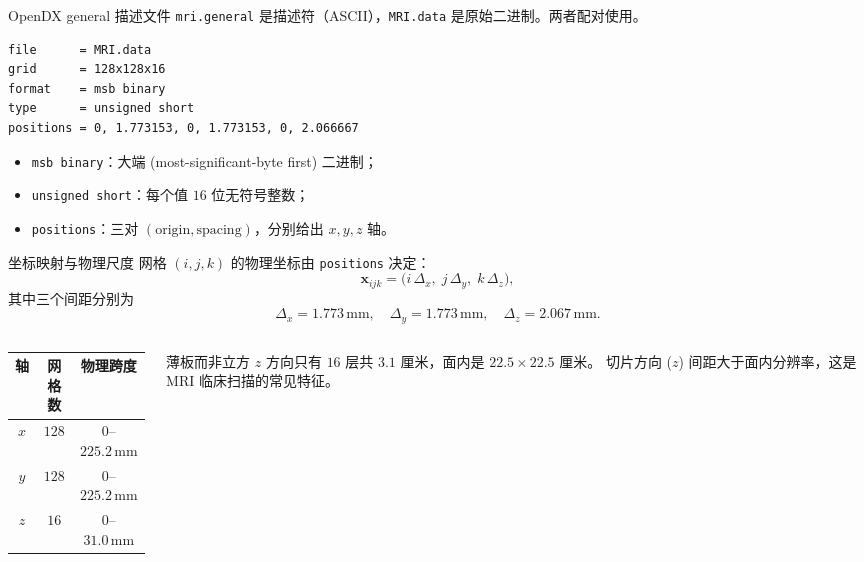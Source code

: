 \documentclass[aspectratio=169,11pt]{ctexbeamer}
\newcommand{\vx}{\mathbf x}
\begin{document}
\begin{frame}[fragile]{OpenDX general 描述文件}
  \small
  \texttt{mri.general} 是描述符（ASCII），\texttt{MRI.data} 是原始二进制。两者配对使用。

  \begin{Verbatim}[fontsize=\scriptsize,frame=single]
file      = MRI.data
grid      = 128x128x16
format    = msb binary
type      = unsigned short
positions = 0, 1.773153, 0, 1.773153, 0, 2.066667
  \end{Verbatim}

  \begin{itemize}
    \item \texttt{msb binary}：大端 (most-significant-byte first) 二进制；
    \item \texttt{unsigned short}：每个值 $16$ 位无符号整数；
    \item \texttt{positions}：三对 $(\text{origin}, \text{spacing})$，分别给出 $x,y,z$ 轴。
  \end{itemize}
\end{frame}

\begin{frame}{坐标映射与物理尺度}
  \small
  网格 $(i,j,k)$ 的物理坐标由 \texttt{positions} 决定：
  \[
    \vx_{ijk}=
    \bigl(i\,\Delta_x,\; j\,\Delta_y,\; k\,\Delta_z\bigr),
  \]
  其中三个间距分别为
  \[
    \Delta_x=1.773\,\mathrm{mm},\quad
    \Delta_y=1.773\,\mathrm{mm},\quad
    \Delta_z=2.067\,\mathrm{mm}.
  \]

  \begin{columns}
    \begin{column}{0.50\linewidth}
      \begin{tabular}{ccc}
        \toprule
        轴 & 网格数 & 物理跨度 \\
        \midrule
        $x$ & $128$ & $0$--$225.2\,\mathrm{mm}$ \\
        $y$ & $128$ & $0$--$225.2\,\mathrm{mm}$ \\
        $z$ & $16$  & $0$--$31.0\,\mathrm{mm}$ \\
        \bottomrule
      \end{tabular}
    \end{column}
    \begin{column}{0.46\linewidth}
      \begin{block}{薄板而非立方}
        $z$ 方向只有 $16$ 层共 $3.1$ 厘米，面内是 $22.5\times 22.5$ 厘米。
        切片方向 ($z$) 间距大于面内分辨率，这是 MRI 临床扫描的常见特征。
      \end{block}
    \end{column}
  \end{columns}
\end{frame}
\end{document}
